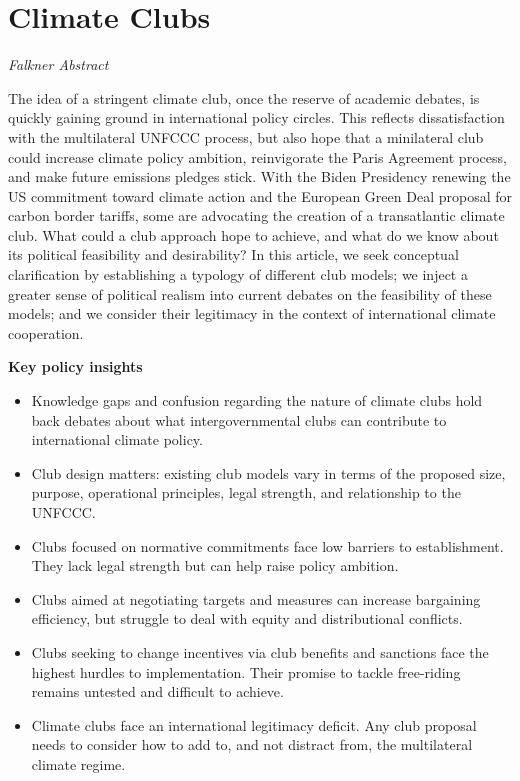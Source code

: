 \documentclass[
]{book}
\providecommand{\tightlist}{%
  \setlength{\itemsep}{0pt}\setlength{\parskip}{0pt}}
\begin{document}
\hypertarget{climate-clubs}{%
\section{Climate Clubs}\label{climate-clubs}}

\emph{Falkner Abstract}

The idea of a stringent climate club, once the reserve of academic debates, is quickly
gaining ground in international policy circles. This reﬂects dissatisfaction with the
multilateral UNFCCC process, but also hope that a minilateral club could increase
climate policy ambition, reinvigorate the Paris Agreement process, and make
future emissions pledges stick. With the Biden Presidency renewing the US
commitment toward climate action and the European Green Deal proposal for
carbon border tariﬀs, some are advocating the creation of a transatlantic climate
club. What could a club approach hope to achieve, and what do we know about
its political feasibility and desirability? In this article, we seek conceptual
clariﬁcation by establishing a typology of diﬀerent club models; we inject a greater
sense of political realism into current debates on the feasibility of these models;
and we consider their legitimacy in the context of international climate cooperation.

\textbf{Key policy insights}

\begin{itemize}
\tightlist
\item
  Knowledge gaps and confusion regarding the nature of climate clubs hold back
  debates about what intergovernmental clubs can contribute to international
  climate policy.
\item
  Club design matters: existing club models vary in terms of the proposed size,
  purpose, operational principles, legal strength, and relationship to the UNFCCC.
\item
  Clubs focused on normative commitments face low barriers to establishment.
  They lack legal strength but can help raise policy ambition.
\item
  Clubs aimed at negotiating targets and measures can increase bargaining
  efficiency, but struggle to deal with equity and distributional conﬂicts.
\item
  Clubs seeking to change incentives via club beneﬁts and sanctions face the
  highest hurdles to implementation. Their promise to tackle free-riding remains
  untested and diﬃcult to achieve.
\item
  Climate clubs face an international legitimacy deﬁcit. Any club proposal needs to
  consider how to add to, and not distract from, the multilateral climate regime.
\end{itemize}
\end{document}
